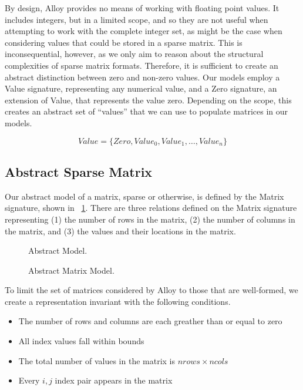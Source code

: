 \documentclass[11pt,conference]{IEEEtran}
\begin{document}
By design, Alloy provides no means of working with floating point values.  It includes integers, but in a limited scope, and so they are not useful when attempting to work with the complete integer set, as might be the case when considering values that could be stored in a sparse matrix.  This is inconsequential, however, as we only aim to reason about the structural complexities of sparse matrix formats.  Therefore, it is sufficient to create an abstract distinction between zero and non-zero values.  Our models employ a Value signature, representing any numerical value, and a Zero signature, an extension of Value, that represents the value zero.  Depending on the scope, this creates an abstract set of ``values'' that we can use to populate matrices in our models.

\begin{displaymath}
Value = \{Zero, Value_0, Value_1, \ldots, Value_n\}
\end{displaymath}

\subsection{Abstract Sparse Matrix}

Our abstract model of a matrix, sparse or otherwise, is defined by the Matrix signature, shown in \figurename~\ref{model:abstract}.  There are three relations defined on the Matrix signature representing (1) the number of rows in the matrix, (2) the number of columns in the matrix, and (3) the values and their locations in the matrix.

\begin{figure}
\centering
Abstract Model.
\caption{Abstract Matrix Model.}
\label{model:abstract}
\end{figure}

To limit the set of matrices considered by Alloy to those that are well-formed, we create a representation invariant with the following conditions. 

\begin{itemize}
	\item The number of rows and columns are each greather than or equal to zero
	\item All index values fall within bounds
	\item The total number of values in the matrix is \(nrows \times ncols\)
	\item Every \(i, j\) index pair appears in the matrix
\end{itemize}
\end{document}
